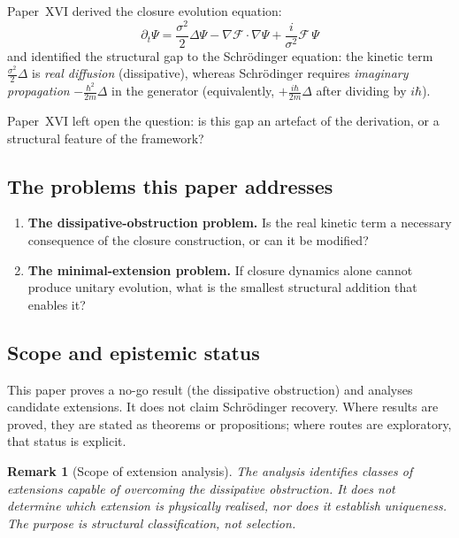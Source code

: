 \documentclass[12pt]{article}
\newtheorem{remark}[theorem]{Remark}
\newcommand{\Fcal}{\mathcal{F}}
\begin{document}
Paper~XVI derived the closure evolution equation:
\begin{equation}\label{eq:closure_evo}
    \partial_t \Psi = \frac{\sigma^2}{2}\Delta\Psi - \nabla\Fcal\cdot\nabla\Psi + \frac{i}{\sigma^2}\Fcal\,\Psi
\end{equation}
and identified the structural gap to the Schr\"odinger equation: the kinetic term $\frac{\sigma^2}{2}\Delta$ is \textit{real diffusion} (dissipative), whereas Schr\"odinger requires \textit{imaginary propagation} $-\frac{\hbar^2}{2m}\Delta$ in the generator (equivalently, $+\frac{i\hbar}{2m}\Delta$ after dividing by $i\hbar$).

Paper~XVI left open the question: is this gap an artefact of the derivation, or a structural feature of the framework?

\subsection*{The problems this paper addresses}

\begin{enumerate}
    \item[(P8)] \textbf{The dissipative-obstruction problem.} Is the real kinetic term a necessary consequence of the closure construction, or can it be modified?

    \item[(P9)] \textbf{The minimal-extension problem.} If closure dynamics alone cannot produce unitary evolution, what is the smallest structural addition that enables it?
\end{enumerate}

\subsection*{Scope and epistemic status}

This paper proves a no-go result (the dissipative obstruction) and analyses candidate extensions. It does not claim Schr\"odinger recovery. Where results are proved, they are stated as theorems or propositions; where routes are exploratory, that status is explicit.

\begin{remark}[Scope of extension analysis]
The analysis identifies classes of extensions capable of overcoming the dissipative obstruction. It does not determine which extension is physically realised, nor does it establish uniqueness. The purpose is structural classification, not selection.
\end{remark}
\end{document}
